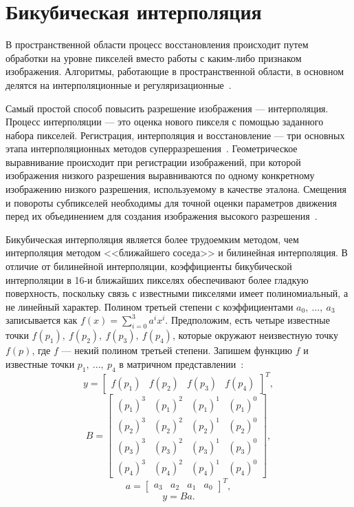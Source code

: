 \documentclass{bmstu}
\begin{document}
\section{Бикубическая интерполяция}

В пространственной области процесс восстановления происходит путем обработки на уровне пикселей вместо работы с каким-либо признаком изображения. 
Алгоритмы, работающие в пространственной области, в основном делятся на интерполяционные и регуляризационные~\cite{Daithankar2021}.

Самый простой способ повысить разрешение изображения --- интерполяция. 
Процесс интерполяции --- это оценка нового пикселя с помощью заданного набора пикселей. 
Регистрация, интерполяция и восстановление --- три основных этапа интерполяционных методов суперразрешения~\cite{Thapa2016}. 
Геометрическое выравнивание происходит при регистрации изображений, при которой изображения низкого разрешения выравниваются по одному конкретному изображению низкого разрешения, используемому в качестве эталона. 
Смещения и повороты субпикселей необходимы для точной оценки параметров движения перед их объединением для создания изображения высокого разрешения~\cite{Daithankar2021}.

Бикубическая интерполяция является более трудоемким методом, чем интерполяция методом <<ближайшего соседа>> и билинейная интерполяция. 
В отличие от билинейной интерполяции, коэффициенты бикубической интерполяции в 16-и ближайших пикселях обеспечивают более гладкую поверхность, поскольку связь с известными пикселями имеет полиномиальный, а не линейный характер. 
Полином третьей степени с коэффициентами $a_0,~...,~a_3$ записывается как $f(x) = \sum_{i = 0}^{3} a^ix^i$. 
Предположим, есть четыре известные точки $f(p_1),~f(p_2),~f(p_3),~f(p_4)$, которые окружают неизвестную точку $f(p)$, где $f$ --- некий полином третьей степени. 
Запишем функцию $f$ и известные точки $p_1,~...,~p_4$ в матричном представлении~\cite{Bavenstrand2021}:
\begin{equation}
y = \begin{bmatrix}
f(p_1) & f(p_2) & f(p_3) & f(p_4)
\end{bmatrix}^{T},
\end{equation}
\begin{equation}
B = \begin{bmatrix}
    (p_1)^3 & (p_1)^2 & (p_1)^1 & (p_1)^0 \\
    (p_2)^3 & (p_2)^2 & (p_2)^1 & (p_2)^0 \\
    (p_3)^3 & (p_3)^2 & (p_3)^1 & (p_3)^0 \\
    (p_4)^3 & (p_4)^2 & (p_4)^1 & (p_4)^0
\end{bmatrix},
\end{equation}
\begin{equation}
a = \begin{bmatrix}
a_3 & a_2 & a_1 & a_0
\end{bmatrix}^{T},
\end{equation}
\begin{equation}
y = Ba.
\end{equation}
\end{document}
